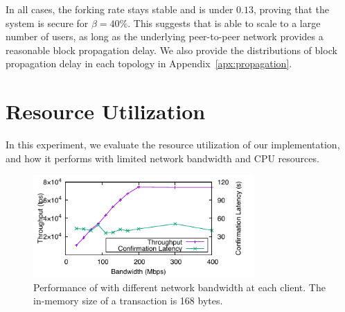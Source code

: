 In all cases, the forking rate stays stable and is under $0.13$, proving that the system is secure for $\beta=40\%$. This suggests that \prism is able to scale to a large number of users, as long as the underlying peer-to-peer network provides a reasonable block propagation delay. We also provide the distributions of block propagation delay in each topology in Appendix~\ref{apx:propagation}.

\section{Resource Utilization}
\label{sec:eval-resource}

In this experiment, we evaluate the resource utilization of our \prism implementation, and how it performs with limited network bandwidth and CPU resources. 





\begin{figure}
    \centering
    \includegraphics[width=0.75\textwidth]{figures/resource-fig-bw.pdf}
    \caption{\small Performance of \prism with different network bandwidth at each client. The in-memory size of a transaction is 168 bytes.}
    \label{fig:bw}
\end{figure}

